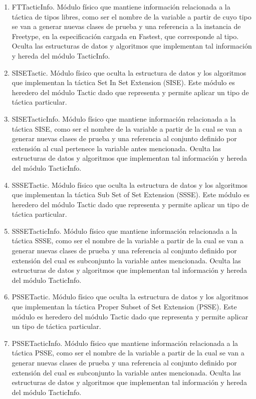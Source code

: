 \documentclass[a4paper,10pt]{report}
\begin{document}
\begin{enumerate}
						\item{FTTacticInfo. Módulo físico que mantiene información relacionada a la táctica de tipos libres, como ser el nombre de la variable a partir de cuyo tipo se van a generar nuevas clases de prueba y una referencia a la instancia de Freetype, en la especificación cargada en Fastest, que corresponde al tipo. Oculta las estructuras de datos y algoritmos que implementan tal información y hereda del módulo TacticInfo.}
						\item{SISETactic. Módulo físico que oculta la estructura de datos y los algoritmos que implementan la táctica Set In Set Extension (SISE). Este módulo es heredero del módulo Tactic dado que representa y permite aplicar un tipo de táctica particular.}
						\item{SISETacticInfo. Módulo físico que mantiene información relacionada a la táctica SISE, como ser el nombre de la variable a partir de la cual se van a generar nuevas clases de prueba y una referencia al conjunto definido por extensión al cual pertenece la variable antes mencionada. Oculta las estructuras de datos y algoritmos que implementan tal información y hereda del módulo TacticInfo.}
						\item{SSSETactic. Módulo físico que oculta la estructura de datos y los algoritmos que implementan la táctica Sub Set of Set Extension (SSSE). Este módulo es heredero del módulo Tactic dado que representa y permite aplicar un tipo de táctica particular.}
						\item{SSSETacticInfo. Módulo físico que mantiene información relacionada a la táctica SSSE, como ser el nombre de la variable a partir de la cual se van a generar nuevas clases de prueba y una referencia al conjunto definido por extensión del cual es subconjunto la variable antes mencionada. Oculta las estructuras de datos y algoritmos que implementan tal información y hereda del módulo TacticInfo.}
						\item{PSSETactic. Módulo físico que oculta la estructura de datos y los algoritmos que implementan la táctica Proper Subset of Set Extension (PSSE). Este módulo es heredero del módulo Tactic dado que representa y permite aplicar un tipo de táctica particular.}
						\item{PSSETacticInfo. Módulo físico que mantiene información relacionada a la táctica PSSE, como ser el nombre de la variable a partir de la cual se van a generar nuevas clases de prueba y una referencia al conjunto definido por extensión del cual es subconjunto la variable antes mencionada. Oculta las estructuras de datos y algoritmos que implementan tal información y hereda del módulo TacticInfo.}

\end{enumerate}
\end{document}
